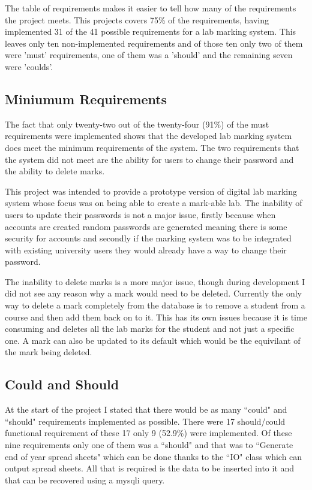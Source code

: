 \documentclass[11pt]{report}
\begin{document}
The table of requirements makes it easier to tell how many of the requirements the project meets. This projects covers 75\% of the requirements, having implemented 31 of the 41 possible requirements for a lab marking system. This leaves only ten non-implemented requirements and of those ten only two of them were 'must' requirements, one of them was a 'should' and the remaining seven were 'coulds'.

\newpage
\subsection*{Miniumum Requirements}

The fact that only twenty-two out of the twenty-four (91\%) of the  must requirements were  implemented shows that the developed lab marking system does meet the minimum requirements of the system. The two requirements that the system did not meet are the ability for users to change their password and the ability to delete marks.

This project was intended to provide a prototype version of digital lab marking system whose focus was on being able to create a mark-able lab. The inability of users to update their passwords is not a major issue, firstly because when accounts are created random passwords are generated meaning there is some security for accounts and secondly if the marking system was to be integrated with existing university users  they would already have a way to change their password.

The inability to delete marks is a more major issue, though during development I did not see any reason why a mark would need to be deleted. Currently the only way to delete a mark completely from the database is to remove a student from a course and then add them back on to it. This has its own issues because it is time consuming  and deletes all the lab marks for the student and not just a specific one. A mark can also be updated to its default which would be the equivilant of the mark being deleted.

\subsection*{Could and Should}

At the start of the project I stated that there would be as many ``could" and ``should" requirements implemented as possible. There were 17 should/could functional requirement of these 17 only 9 (52.9\%) were implemented. Of these nine requirements only one of them was a ``should" and that was to ``Generate end of year spread sheets" which can be done thanks to the ``IO" class which can output spread sheets. All that is required is the data to be inserted into it and that can be recovered using a mysqli query.    
\end{document}
